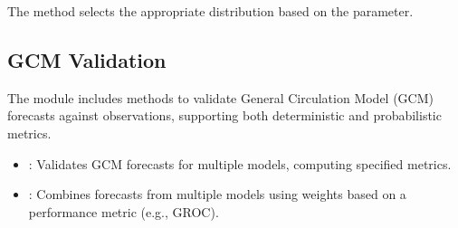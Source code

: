 \documentclass[letterpaper,10pt,english]{sphinxmanual}
\begin{document}
\sphinxAtStartPar
The  method selects the appropriate distribution based on the  parameter.


\subsection{GCM Validation}
\label{\detokenize{Verification:gcm-validation}}
\sphinxAtStartPar
The module includes methods to validate General Circulation Model (GCM) forecasts against observations, supporting both deterministic and probabilistic metrics.

\sphinxAtStartPar
{}
\begin{itemize}
\item {} 
\sphinxAtStartPar
{}: Validates GCM forecasts for multiple models, computing specified metrics.

\item {} 
\sphinxAtStartPar
{}: Combines forecasts from multiple models using weights based on a performance metric (e.g., GROC).

\end{itemize}

\sphinxAtStartPar
{}
\end{document}
